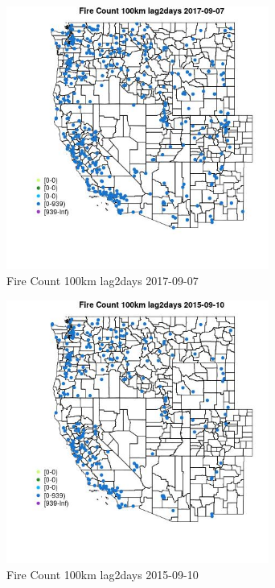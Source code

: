 \begin{figure} 
\centering  
\includegraphics[width=0.77\textwidth]{Code_Outputs/Report_ML_input_PM25_Step4_part_e_de_duplicated_aves_compiled_2019-05-20wNAs_MapObsFire_Count_100km_lag2days2017-09-07.jpg} 
\caption{\label{fig:Report_ML_input_PM25_Step4_part_e_de_duplicated_aves_compiled_2019-05-20wNAsMapObsFire_Count_100km_lag2days2017-09-07}Fire Count 100km lag2days 2017-09-07} 
\end{figure} 
 

\begin{figure} 
\centering  
\includegraphics[width=0.77\textwidth]{Code_Outputs/Report_ML_input_PM25_Step4_part_e_de_duplicated_aves_compiled_2019-05-20wNAs_MapObsFire_Count_100km_lag2days2015-09-10.jpg} 
\caption{\label{fig:Report_ML_input_PM25_Step4_part_e_de_duplicated_aves_compiled_2019-05-20wNAsMapObsFire_Count_100km_lag2days2015-09-10}Fire Count 100km lag2days 2015-09-10} 
\end{figure} 
 

